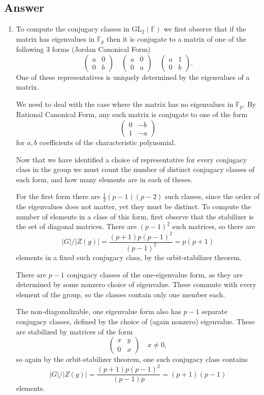 \documentclass[11pt]{article}
\begin{document}
\subsection{Answer}
\begin{enumerate}
\item To compute the conjugacy classes in GL$_2(\mathbb{F})$ we first observe that if the matrix has eigenvalues in $\mathbb{F}_p$ then it is conjugate to a matrix of one of the following 3 forms (Jordan Canonical Form)
\[\left( \begin{array}{cc} a& 0\\0&b\end{array}\right)\quad \left( \begin{array}{cc} a& 0\\0&a\end{array}\right) \quad \left( \begin{array}{cc} a& 1\\0&b\end{array}\right).\]
One of these representatives is uniquely determined by the eigenvalues of a matrix.

We need to deal with the case where the matrix has no eigenvalues in $\mathbb{F}_p$. By Rational Canonical Form, any such matrix is conjugate to one of the form
\[\left( \begin{array}{cc} 0& -b\\1&-a\end{array}\right)\]
for $a, b$ coefficients of the characteristic polynomial.

Now that we have identified a choice of representative for every conjugacy class in the group we must count the number of distinct conjugacy classes of each form, and how many elements are in each of theses.

For the first form there are $\frac{1}{2}(p-1)(p-2)$ such classes, since the order of the eigenvalues does not matter, yet they must be distinct. To compute the number of elements in a class of this form, first observe that the stabilizer is the set of diagonal matrices. There are $(p-1)^2$ such matrices, so there are 
\[|G|/|Z(g)| = \frac{(p+1)p(p-1)^2}{(p-1)^2} = p(p+1) \]
elements in a fixed such conjugacy class, by the orbit-stabilizer theorem.

There are $p-1$ conjugacy classes of the one-eigenvalue form, as they are determined by some nonzero choice of eigenvalue. These commute with every element of the group, so the classes contain only one member each.

The non-diagonalizable, one eigenvalue form also has $p-1$ separate conjugacy classes, defined by the choice of (again nonzero) eigenvalue. These are stabilized by matrices of the form
\[\left( \begin{array}{cc} x& y \\ 0 & x \end{array} \right) \quad x \neq 0,\]
so again by the orbit-stabilizer theorem, one such conjugacy class contains
\[|G|/|Z(g)| = \frac{(p+1)p(p-1)^2}{(p-1)p} = (p+1)(p-1) \]
elements.


\end{enumerate}
\end{document}

